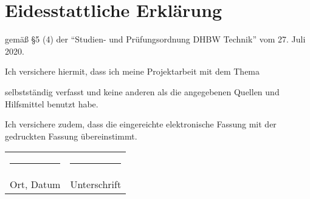 \chapter*{Eidesstattliche Erklärung}
\thispagestyle{empty}
\begin{center}
gemäß \S 5 (4) der "`Studien- und Prüfungsordnung DHBW Technik"' vom 27. Juli 2020.
\vspace{\baselineskip}

Ich versichere hiermit, dass ich meine Projektarbeit mit dem Thema
\vspace{\baselineskip}

\textbf{\titel}

\vspace{\baselineskip}

selbstständig verfasst und keine anderen als die angegebenen Quellen und Hilfsmittel benutzt habe.
\vspace{\baselineskip}

Ich versichere zudem, dass die eingereichte elektronische Fassung mit der gedruckten Fassung übereinstimmt.

\vspace{3cm}

\begin{tabular}{p{7.5cm}p{7.5cm}}
\rule{6cm}{0.4pt} & \rule{6cm}{0.4pt}\\
Ort, Datum & Unterschrift\\

\end{tabular}
\end{center}
